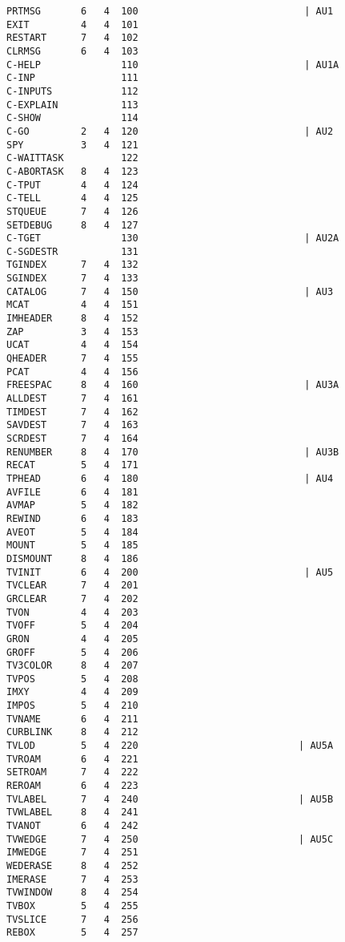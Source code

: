 \begin{verbatim}
PRTMSG       6   4  100                             | AU1
EXIT         4   4  101
RESTART      7   4  102
CLRMSG       6   4  103
C-HELP              110                             | AU1A
C-INP               111
C-INPUTS            112
C-EXPLAIN           113
C-SHOW              114
C-GO         2   4  120                             | AU2
SPY          3   4  121
C-WAITTASK          122
C-ABORTASK   8   4  123
C-TPUT       4   4  124
C-TELL       4   4  125
STQUEUE      7   4  126
SETDEBUG     8   4  127
C-TGET              130                             | AU2A
C-SGDESTR           131
TGINDEX      7   4  132
SGINDEX      7   4  133
CATALOG      7   4  150                             | AU3
MCAT         4   4  151
IMHEADER     8   4  152
ZAP          3   4  153
UCAT         4   4  154
QHEADER      7   4  155
PCAT         4   4  156
FREESPAC     8   4  160                             | AU3A
ALLDEST      7   4  161
TIMDEST      7   4  162
SAVDEST      7   4  163
SCRDEST      7   4  164
RENUMBER     8   4  170                             | AU3B
RECAT        5   4  171
TPHEAD       6   4  180                             | AU4
AVFILE       6   4  181
AVMAP        5   4  182
REWIND       6   4  183
AVEOT        5   4  184
MOUNT        5   4  185
DISMOUNT     8   4  186
TVINIT       6   4  200                             | AU5
TVCLEAR      7   4  201
GRCLEAR      7   4  202
TVON         4   4  203
TVOFF        5   4  204
GRON         4   4  205
GROFF        5   4  206
TV3COLOR     8   4  207
TVPOS        5   4  208
IMXY         4   4  209
IMPOS        5   4  210
TVNAME       6   4  211
CURBLINK     8   4  212
TVLOD        5   4  220                            | AU5A
TVROAM       6   4  221
SETROAM      7   4  222
REROAM       6   4  223
TVLABEL      7   4  240                            | AU5B
TVWLABEL     8   4  241
TVANOT       6   4  242
TVWEDGE      7   4  250                            | AU5C
IMWEDGE      7   4  251
WEDERASE     8   4  252
IMERASE      7   4  253
TVWINDOW     8   4  254
TVBOX        5   4  255
TVSLICE      7   4  256
REBOX        5   4  257
\end{verbatim}
